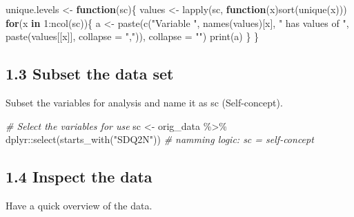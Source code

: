 \documentclass[
]{article}
\newenvironment{Shaded}{\begin{snugshade}}{\end{snugshade}}
\newcommand{\AttributeTok}[1]{\textcolor[rgb]{0.77,0.63,0.00}{#1}}
\newcommand{\CommentTok}[1]{\textcolor[rgb]{0.56,0.35,0.01}{\textit{#1}}}
\newcommand{\ControlFlowTok}[1]{\textcolor[rgb]{0.13,0.29,0.53}{\textbf{#1}}}
\newcommand{\DecValTok}[1]{\textcolor[rgb]{0.00,0.00,0.81}{#1}}
\newcommand{\FunctionTok}[1]{\textcolor[rgb]{0.00,0.00,0.00}{#1}}
\newcommand{\NormalTok}[1]{#1}
\newcommand{\OtherTok}[1]{\textcolor[rgb]{0.56,0.35,0.01}{#1}}
\newcommand{\SpecialCharTok}[1]{\textcolor[rgb]{0.00,0.00,0.00}{#1}}
\newcommand{\StringTok}[1]{\textcolor[rgb]{0.31,0.60,0.02}{#1}}
\begin{document}
\begin{Shaded}
\begin{Highlighting}[]
\NormalTok{unique.levels }\OtherTok{\textless{}{-}}  \ControlFlowTok{function}\NormalTok{(sc)\{}
\NormalTok{  values }\OtherTok{\textless{}{-}} \FunctionTok{lapply}\NormalTok{(sc, }\ControlFlowTok{function}\NormalTok{(x)}\FunctionTok{sort}\NormalTok{(}\FunctionTok{unique}\NormalTok{(x))) }
\ControlFlowTok{for}\NormalTok{(x }\ControlFlowTok{in} \DecValTok{1}\SpecialCharTok{:}\FunctionTok{ncol}\NormalTok{(sc))\{}
\NormalTok{  a }\OtherTok{\textless{}{-}} \FunctionTok{paste}\NormalTok{(}\FunctionTok{c}\NormalTok{(}\StringTok{"Variable "}\NormalTok{, }
               \FunctionTok{names}\NormalTok{(values)[x], }
               \StringTok{" has values of "}\NormalTok{, }
               \FunctionTok{paste}\NormalTok{(values[[x]], }
                     \AttributeTok{collapse =} \StringTok{","}\NormalTok{)), }
             \AttributeTok{collapse =} \StringTok{""}\NormalTok{)}
  \FunctionTok{print}\NormalTok{(a)}
\NormalTok{  \}}
\NormalTok{\}}
\end{Highlighting}
\end{Shaded}

\hypertarget{subset-the-data-set}{%
\subsection{1.3 Subset the data set}\label{subset-the-data-set}}

Subset the variables for analysis and name it as sc (Self-concept).

\begin{Shaded}
\begin{Highlighting}[]
\CommentTok{\# Select the variables for use}
\NormalTok{sc }\OtherTok{\textless{}{-}}\NormalTok{ orig\_data }\SpecialCharTok{\%\textgreater{}\%}\NormalTok{ dplyr}\SpecialCharTok{::}\FunctionTok{select}\NormalTok{(}\FunctionTok{starts\_with}\NormalTok{(}\StringTok{"SDQ2N"}\NormalTok{)) }\CommentTok{\# namming logic: sc = self{-}concept}
\end{Highlighting}
\end{Shaded}

\hypertarget{inspect-the-data}{%
\subsection{1.4 Inspect the data}\label{inspect-the-data}}

Have a quick overview of the data.
\end{document}
